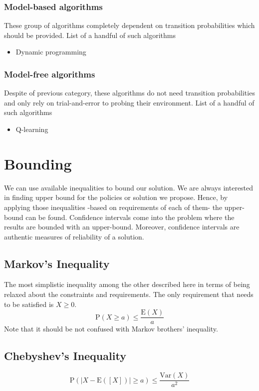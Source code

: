 \documentclass[a4paper,12pt]{article}
\begin{document}
\subsubsection{Model-based algorithms}
These group of algorithms completely dependent on transition probabilities which should be provided. List of a handful of such algorithms
\begin{itemize}
    \item Dynamic programming
\end{itemize}

\subsubsection{Model-free algorithms}
Despite of previous category, these algorithms do not need transition probabilities and only rely on trial-and-error to probing their environment. List of a handful of such algorithms
\begin{itemize}
    \item Q-learning
\end{itemize}


\section{Bounding}
We can use available inequalities to bound our solution. We are always interested in finding upper bound for the policies or solution we propose. Hence, by applying those inequalities -based on requirements of each of them- the upper-bound can be found. Confidence intervals come into the problem where the results are bounded with an upper-bound. Moreover, confidence intervals are authentic measures of reliability of a solution.

\subsection{Markov's Inequality}
The most simplistic inequality among the other described here in terms of being relaxed about the constraints and requirements. The only requirement that needs to be satisfied is $X \geq 0$.
\begin{equation}
\mathrm {P}(X \geq a ) \leq \frac { \mathrm { E}( X ) } { a }
\end{equation}
Note that it should be not confused with Markov brothers' inequality.

\subsection{Chebyshev's Inequality}
\begin{equation}
\mathrm {P}(|X - \mathrm{E}([X])| \geq a ) \leq \frac { \mathrm { Var}( X ) } { a^2 }
\end{equation}
\end{document}

